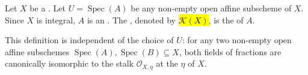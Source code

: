 \begin{definition} \label{definition:function_field_of_an_integral_scheme}
    Let $X$ be a . Let $U = \operatorname{Spec}(A)$ be any non-empty open affine subscheme of $X$. Since $X$ is integral, $A$ is an . The , denoted by \hl{$\mathcal{K}(X)$}, is the  of $A$.

    This definition is independent of the choice of $U$: for any two non-empty open affine subschemes $\operatorname{Spec}(A), \operatorname{Spec}(B) \subseteq X$, both fields of fractions are canonically isomorphic to the stalk $\mathcal{O}_{X, \eta}$ at the  $\eta$ of $X$.
\end{definition}

